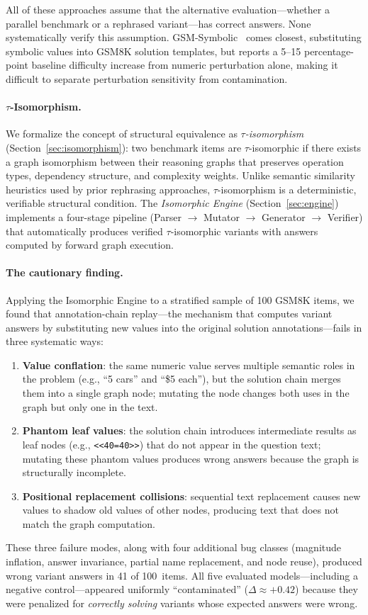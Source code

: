 All of these approaches assume that the alternative evaluation---whether
a parallel benchmark or a rephrased variant---has correct answers. None
systematically verify this assumption. GSM-Symbolic~\cite{mirzadeh2024gsmsymbolic}
comes closest, substituting symbolic values into GSM8K solution
templates, but reports a 5--15 percentage-point baseline difficulty
increase from numeric perturbation alone, making it difficult to
separate perturbation sensitivity from contamination.

\paragraph{$\tau$-Isomorphism.}
We formalize the concept of structural equivalence as
\emph{$\tau$-isomorphism} (Section~\ref{sec:isomorphism}): two
benchmark items are $\tau$-isomorphic if there exists a graph
isomorphism between their reasoning graphs that preserves operation
types, dependency structure, and complexity weights. Unlike semantic
similarity heuristics used by prior rephrasing approaches,
$\tau$-isomorphism is a deterministic, verifiable structural condition.
The \emph{Isomorphic Engine} (Section~\ref{sec:engine}) implements a
four-stage pipeline (Parser $\to$ Mutator $\to$ Generator $\to$
Verifier) that automatically produces verified $\tau$-isomorphic
variants with answers computed by forward graph execution.

\paragraph{The cautionary finding.}
Applying the Isomorphic Engine to a stratified sample of 100 GSM8K
items, we found that annotation-chain replay---the mechanism that
computes variant answers by substituting new values into the
original solution annotations---fails in three systematic ways:
\begin{enumerate}[leftmargin=*, nosep]
\item \textbf{Value conflation}: the same numeric value serves
multiple semantic roles in the problem (e.g., ``5 cars'' and
``\$5 each''), but the solution chain merges them into a single
graph node; mutating the node changes both uses in the graph but only
one in the text.
\item \textbf{Phantom leaf values}: the solution chain introduces
intermediate results as leaf nodes (e.g., \texttt{<<40=40>>}) that
do not appear in the question text; mutating these phantom values
produces wrong answers because the graph is structurally incomplete.
\item \textbf{Positional replacement collisions}: sequential text
replacement causes new values to shadow old values of other nodes,
producing text that does not match the graph computation.
\end{enumerate}
These three failure modes, along with four additional bug classes
(magnitude inflation, answer invariance, partial name replacement,
and node reuse), produced wrong variant answers in 41 of 100~items.
All five evaluated models---including a negative control---appeared
uniformly ``contaminated'' ($\Delta \approx +0.42$) because they were
penalized for \emph{correctly solving} variants whose expected answers
were wrong.

